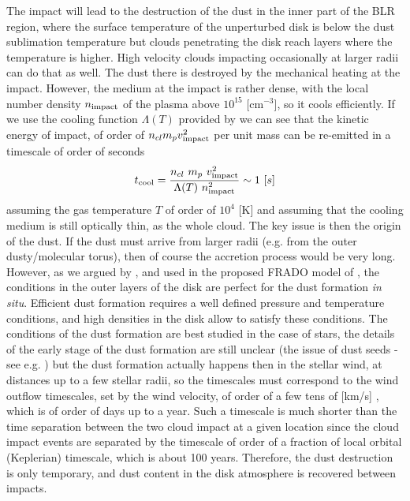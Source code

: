 \documentclass[twocolumn]{aastex62}
\begin{document}
The impact will lead to the destruction of the dust in the inner part of the BLR region, where the surface temperature of the unperturbed disk is below the dust sublimation temperature but clouds penetrating the disk reach layers where the temperature is higher. High velocity clouds impacting occasionally at larger radii can do that as well. The dust there is destroyed by the mechanical heating at the impact. However, the medium at the impact is rather dense, with the local number density $n_{\rm impact}$ of the plasma above $10^{15}$ [cm$^{-3}$], so it cools efficiently. If we use the cooling function $\Lambda(T)$ provided by \citet{gnat2012} we can see that the kinetic energy of impact, of order of $n_{cl} m_p v_{\rm impact}^2$ per unit mass can be re-emitted in a timescale of order of seconds
\begin{equation}
    t_{\rm cool} =
    \frac{ n_{cl} ~ m_p~ v^2_{\rm impact} }
    { \Lambda(T)~ n_{\rm impact}^2 } \sim 1~ [s]
\end{equation}
assuming the gas temperature $T$ of order of $10^4$ [K] and assuming that the cooling medium is still optically thin, as the whole cloud. The key issue is then the origin of the dust. If the dust must arrive from larger radii (e.g. from the outer dusty/molecular torus), then of course the accretion process would be very long. However, as we argued by \citet{elvis2002}, and used in the proposed FRADO model of  \citet{Czerny2011},  the conditions in the outer layers of the disk are perfect for the dust formation {\it in situ}. Efficient dust formation requires a well defined pressure and temperature conditions, and high densities in the disk allow to satisfy these conditions. The conditions of the dust formation are best studied in the case of stars, the details of the early stage of the dust formation are still unclear (the issue of dust seeds - see e.g. \citealp{ventura2012}) but the dust formation actually happens then in the stellar wind, at distances up to a few stellar radii, so the timescales must correspond to the wind outflow timescales, set by the wind velocity, of order of a few tens of [km/s] \citep[e.g.][]{Goldman2017}, which is of order of days up to a year. Such a timescale is much shorter than the time separation between the two cloud impact at a given location since the cloud impact events are separated by the timescale of order of a fraction of local orbital (Keplerian) timescale, which is about 100 years. Therefore, the dust destruction is only temporary, and dust content in the disk atmosphere is recovered between impacts.
\end{document}
